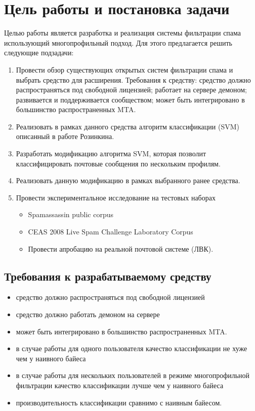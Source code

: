 \newpage
\section{Цель работы и постановка задачи}

Целью работы является разработка и реализация системы фильтрации спама использующий многопрофильный подход.
Для этого предлагается решить следующие подзадачи:
\begin{enumerate}
\item  Провести обзор существующих открытых систем фильтрации спама и выбрать средство для расширения. Требования к средству:
средство должно распространяться под свободной лицензией;
работает на сервере демоном;
развивается и поддерживается сообществом;
может быть интегрировано в большинство распространенных MTA.
\item Реализовать в рамках данного средства алгоритм классификации (SVM) описанный в работе Розинкина.
\item Разработать модификацию алгоритма SVM, которая позволит классифицировать почтовые сообщения по нескольким профилям.
\item Реализовать данную модификацию в рамках выбранного ранее средства.
\item Провести экспериментальное исследование на тестовых наборах
\begin{itemize}
    \item Spamassassin public corpus
    \item CEAS 2008 Live Spam Challenge Laboratory Corpus
    \item Провести апробацию на реальной почтовой системе (ЛВК).
\end{itemize}
\end{enumerate}


\subsection{Требования к разрабатываемому средству}
\begin{itemize}
\item средство должно распространяться под свободной лицензией
\item средство должно работать демоном на сервере
\item может быть интегрировано в большинство распространенных MTA.
\item в случае работы для одного пользователя качество классификации не хуже чем у наивного байеса
\item в случае работы для нескольких пользователей в режиме многопрофильной фильтрации качество классификации лучше чем у наивного байеса
\item производительность классификации сравнимо с наивным байесом.
\end{itemize}

